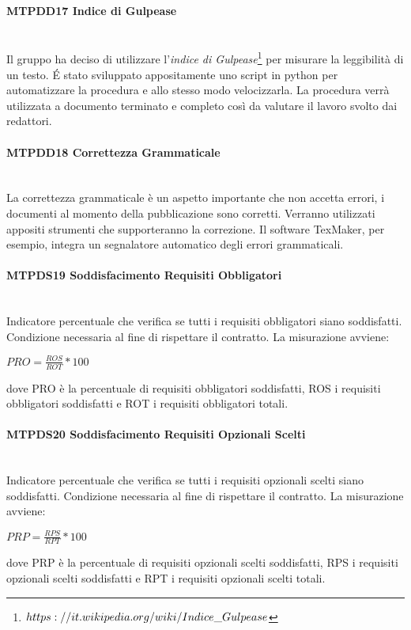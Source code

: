 \paragraph{MTPDD17 Indice di Gulpease}\-\\
Il gruppo ha deciso di utilizzare l'\textit{indice di Gulpease}\glossario\footnote{\texttt{$https://it.wikipedia.org/wiki/Indice\char`_Gulpease$}} per misurare la leggibilità di un testo. \'E stato sviluppato appositamente uno script in python per automatizzare la procedura e allo stesso modo velocizzarla. La procedura verrà utilizzata a documento terminato e completo così da valutare il lavoro svolto dai redattori.

\paragraph{MTPDD18 Correttezza Grammaticale}\-\\
La correttezza grammaticale è un aspetto importante che non accetta errori, i documenti al momento della pubblicazione sono corretti. Verranno utilizzati appositi strumenti che supporteranno la correzione. Il software TexMaker, per esempio, integra un segnalatore automatico degli errori grammaticali. 

\paragraph{MTPDS19 Soddisfacimento Requisiti Obbligatori}\-\\
Indicatore percentuale che verifica se tutti i requisiti obbligatori siano soddisfatti. Condizione necessaria al fine di rispettare il contratto. La misurazione avviene:
\begin{center}
	\item $PRO = \frac{ROS}{ROT}*100$
\end{center}
dove PRO è la percentuale di requisiti obbligatori soddisfatti, ROS i requisiti obbligatori soddisfatti e ROT i requisiti obbligatori totali.

\paragraph{MTPDS20 Soddisfacimento Requisiti Opzionali Scelti}\-\\
Indicatore percentuale che verifica se tutti i requisiti opzionali scelti siano soddisfatti. Condizione necessaria al fine di rispettare il contratto. La misurazione avviene:
\begin{center}
	\item $PRP = \frac{RPS}{RPT}*100$
\end{center}
dove PRP è la percentuale di requisiti opzionali scelti soddisfatti, RPS i requisiti opzionali scelti soddisfatti e RPT i requisiti opzionali scelti totali.

